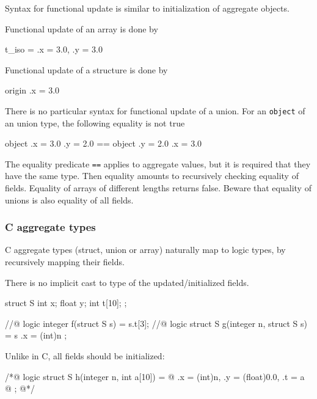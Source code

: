 Syntax for functional update is similar to initialization of aggregate objects.
\begin{example}
Functional update of an array is done by
\begin{listing-nonumber}
{ t_iso \with [0] = { .x = 3.0, .y = 3.0 } }
\end{listing-nonumber}

Functional update of a structure is done by
\begin{listing-nonumber}
{ origin \with .x = 3.0 }
\end{listing-nonumber}

There is no particular syntax for functional update of a union.
For an \lstinline|object| of an union type, the following equality is not true 
\begin{listing-nonumber}
{ { object \with .x = 3.0 }
           \with .y = 2.0 } == { { object \with .y = 2.0 }
                                          \with .x = 3.0 }
\end{listing-nonumber}

\end{example}

The equality predicate \lstinline|==| applies to aggregate values, but it
is required that they have the same type. Then equality amounts to
recursively checking equality of fields.  Equality of arrays of different
lengths returns false.  Beware that equality of unions is also
equality of all fields.


\subsubsection{C aggregate types}

C aggregate types (struct, union or array) naturally map to logic
types, by recursively mapping their fields.

\begin{example}
There is no implicit cast to type of the updated/initialized fields.
\begin{listing-nonumber}
struct S { int x; float y; int t[10]; };

//@ logic integer f(struct S s) = s.t[3];
//@ logic struct S g(integer n, struct S s) = { s \with .x = (int)n };
\end{listing-nonumber}
Unlike in C, all fields should be initialized:
\begin{listing-nonumber}
/*@ logic struct S h(integer n, int a[10]) = {
  @   .x = (int)n, .y = (float)0.0, .t = a
  @   };
  @*/
\end{listing-nonumber}
\end{example}

